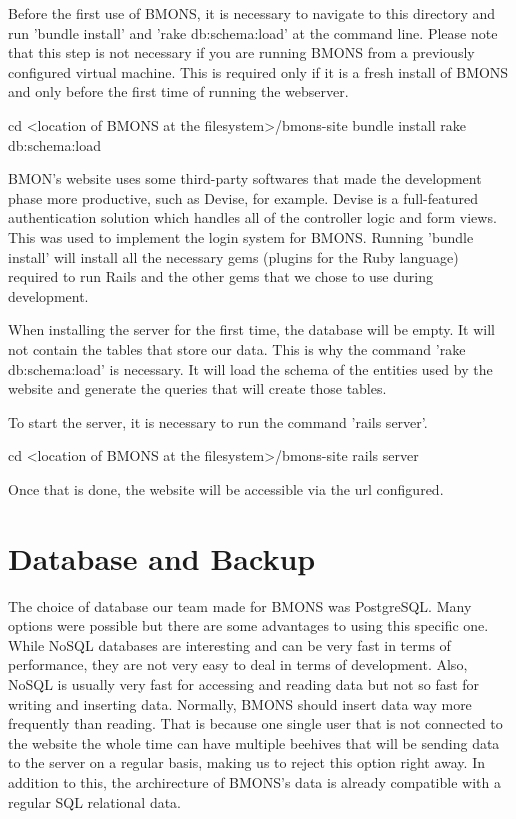 Before the first use of BMONS, it is necessary to navigate to this directory and run 'bundle install' and 'rake db:schema:load' at the command line. Please note that this step is not necessary if you are running BMONS from a previously configured virtual machine. This is required only if it is a fresh install of BMONS and only before the first time of running the webserver.

cd <location of BMONS at the filesystem>/bmons-site
bundle install
rake db:schema:load

BMON's website uses some third-party softwares that made the development phase more productive, such as Devise, for example. Devise is a full-featured authentication solution which handles all of the controller logic and form views. This was used to implement the login system for BMONS. Running 'bundle install' will install all the necessary gems (plugins for the Ruby language) required to run Rails and the other gems that we chose to use during development. 

When installing the server for the first time, the database will be empty. It will not contain the tables that store our data. This is why the command 'rake db:schema:load' is necessary. It will load the schema of the entities used by the website and generate the queries that will create those tables.

To start the server, it is necessary to run the command 'rails server'.

cd <location of BMONS at the filesystem>/bmons-site
rails server

Once that is done, the website will be accessible via the url configured.

\section{Database and Backup}

The choice of database our team made for BMONS was PostgreSQL. Many options were possible but there are some advantages to using this specific one. While NoSQL databases are interesting and can be very fast in terms of performance, they are not very easy to deal in terms of development. Also, NoSQL is usually very fast for accessing and reading data but not so fast for writing and inserting data. Normally, BMONS should insert data way more frequently than reading. That is because one single user that is not connected to the website the whole time can have multiple beehives that will be sending data to the server on a regular basis, making us to reject this option right away. In addition to this, the archirecture of BMONS's data is already compatible with a regular SQL relational data.

